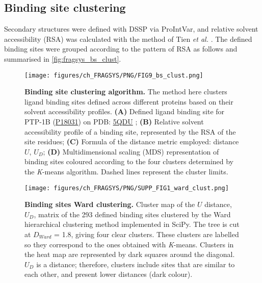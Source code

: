 \subsection{Binding site clustering}

Secondary structures were defined with DSSP \cite{KABSCH_1983_DSSP} via ProIntVar, and relative solvent accessibility (RSA) was calculated with the method of Tien \textit{et al.} \cite{TIEN_2013_RSA}. The defined binding sites were grouped according to the pattern of RSA as follows and summarised in \autoref{fig:fragsys_bs_clust}.

\begin{figure}[htb!]
    \centering
    \texttt{[image: figures/ch\_FRAGSYS/PNG/FIG9\_bs\_clust.png]}
    \caption[Binding site clustering algorithm]{\textbf{Binding site clustering algorithm.} The method here clusters ligand binding sites defined across different proteins based on their solvent accessibility profiles. \textbf{(A)} Defined ligand binding site for PTP-1B (\href{https://www.uniprot.org/uniprotkb/P18031/entry}{P18031}) on PDB: \href{https://www.ebi.ac.uk/pdbe/entry/pdb/5qdu}{5QDU} \cite{KEEDY_2018_PTP1B}; \textbf{(B)} Relative solvent accessibility profile of a binding site, represented by the RSA of the site residues; \textbf{(C)} Formula of the distance metric employed: distance $U$, $U_{D}$; \textbf{(D)} Multidimensional scaling (MDS) representation of binding sites coloured according to the four clusters determined by the \textit{K}-means algorithm. Dashed lines represent the cluster limits.}
    \label{fig:fragsys_bs_clust}
\end{figure}

\begin{figure}[htb!]
    \centering
    \texttt{[image: figures/ch\_FRAGSYS/PNG/SUPP\_FIG1\_ward\_clust.png]}
    \caption[Binding sites Ward clustering]{\textbf{Binding sites Ward clustering.} Cluster map of the $U$ distance, $U_{D}$, matrix of the 293 defined binding sites clustered by the Ward hierarchical clustering method implemented in SciPy. The tree is cut at $D_{Ward}$ = 1.8, giving four clear clusters. These clusters are labelled so they correspond to the ones obtained with \textit{K}-means. Clusters in the heat map are represented by dark squares around the diagonal. $U_{D}$ is a distance; therefore, clusters include sites that are similar to each other, and present lower distances (dark colour).}
    \label{fig:fragsys_bs_clust_ward}
\end{figure}

